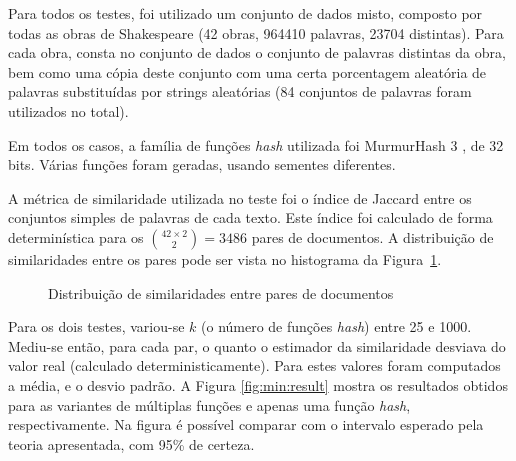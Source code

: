 Para todos os testes, foi utilizado um conjunto de dados misto, composto por todas as obras de Shakespeare (42 obras, 964410 palavras, 23704 distintas). Para cada obra, consta no conjunto de dados o conjunto de palavras distintas da obra, bem como uma cópia deste conjunto com uma certa porcentagem aleatória de palavras substituídas por strings aleatórias (84 conjuntos de palavras foram utilizados no total).

Em todos os casos, a família de funções \emph{hash} utilizada foi MurmurHash 3 \cite{appleby2012murmur}, de 32 bits. Várias funções foram geradas, usando sementes diferentes.

A métrica de similaridade utilizada no teste foi o índice de Jaccard entre os conjuntos simples de palavras de cada texto. Este índice foi calculado de forma determinística para os $\binom{42 \times 2}{2} = 3486$ pares de documentos. A distribuição de similaridades entre os pares pode ser vista no histograma da Figura~\ref{fig:minhash_dist}.

\begin{figure}[!htbp]
\centering
{}
\caption{Distribuição de similaridades entre pares de documentos}
\label{fig:minhash_dist}
\end{figure}


Para os dois testes, variou-se $k$ (o número de funções \emph{hash}) entre 25 e 1000. Mediu-se então, para cada par, o quanto o estimador da similaridade desviava do valor real (calculado deterministicamente). Para estes valores foram computados a média, e o desvio padrão. A Figura \ref{fig:min:result} mostra os resultados obtidos para as variantes de múltiplas funções e apenas uma função \emph{hash}, respectivamente. Na figura é possível comparar com o intervalo esperado pela teoria apresentada, com 95\% de certeza.


